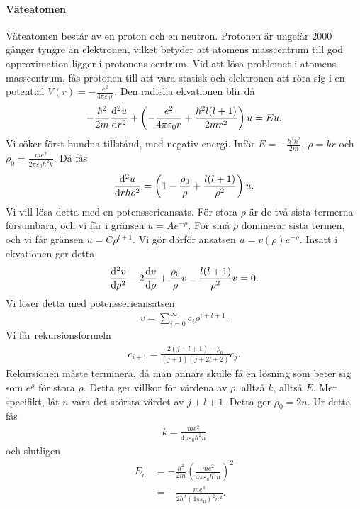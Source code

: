 \paragraph{Väteatomen}
Väteatomen består av en proton och en neutron. Protonen är ungefär $2000$ gånger tyngre än elektronen, vilket betyder att atomens masscentrum till god approximation ligger i protonens centrum. Vid att lösa problemet i atomens masscentrum, fås protonen till att vara statisk och elektronen att röra sig i en potential $V(r) = -\frac{e^{2}}{4\pi\varepsilon_{0}r}$. Den radiella ekvationen blir då
\begin{align*}
	-\frac{\hbar^{2}}{2m}\dv[2]{u}{r} + \left(-\frac{e^{2}}{4\pi\varepsilon_{0}r} + \frac{\hbar^{2}l(l + 1)}{2mr^{2}}\right)u = Eu.
\end{align*}
Vi söker först bundna tillstånd, med negativ energi. Inför $E = -\frac{\hbar^{2}k^{2}}{2m},\ \rho = kr$ och $\rho_{0} = \frac{me^{2}}{2\pi\varepsilon_{0}\hbar^{2}k}$. Då fås
\begin{align*}
	\dv[2]{u}{rho} = \left(1 - \frac{\rho_{0}}{\rho} + \frac{l(l + 1)}{\rho^{2}}\right)u.
\end{align*}
Vi vill lösa detta med en potensserieansats. För stora $\rho$ är de två sista termerna försumbara, och vi får i gränsen $u = Ae^{-\rho}$. För små $\rho$ dominerar sista termen, och vi får gränsen $u = C\rho^{l + 1}$. Vi gör därför ansatsen $u = v(\rho)e^{-\rho}$. Insatt i ekvationen ger detta
\begin{align*}
	\dv[2]{v}{\rho} - 2\dv{v}{\rho} + \frac{\rho_{0}}{\rho}v - \frac{l(l + 1)}{\rho^{2}}v = 0.
\end{align*}
Vi löser detta med potensserieansatsen
\begin{align*}
	v = \sum\limits_{i = 0}^{\infty}c_{i}\rho^{i + l + 1}.
\end{align*}
Vi får rekursionsformeln
\begin{align*}
	c_{i + 1} = \frac{2(j + l + 1) - \rho_{0}}{(j + 1)(j + 2l + 2)}c_{j}.
\end{align*}
Rekursionen måste terminera, då man annars skulle få en lösning som beter sig som $e^{\rho}$ för stora $\rho$. Detta ger villkor för värdena av $\rho$, alltså $k$, alltså $E$. Mer specifikt, låt $n$ vara det största värdet av $j + l + 1$. Detta ger $\rho_{0} = 2n$. Ur detta fås
\begin{align*}
	k = \frac{me^{2}}{4\pi\varepsilon_{0}\hbar^{2}n}
\end{align*}
och slutligen
\begin{align*}
	E_{n} &= -\frac{\hbar^{2}}{2m}\left(\frac{me^{2}}{4\pi\varepsilon_{0}\hbar^{2}n}\right)^{2} \\
	      &= -\frac{me^{4}}{2\hbar^{2}(4\pi\varepsilon_{0})^{2}n^{2}}.
\end{align*}
